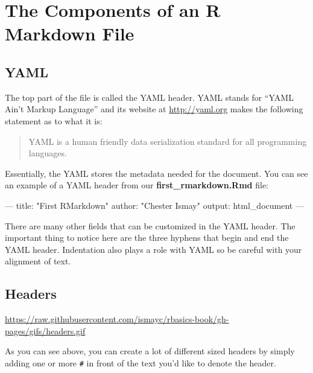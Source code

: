 \documentclass[]{tufte-book}
\newenvironment{Shaded}{\begin{snugshade}}{\end{snugshade}}
\newcommand{\StringTok}[1]{\textcolor[rgb]{0.31,0.60,0.02}{{#1}}}
\newcommand{\OtherTok}[1]{\textcolor[rgb]{0.56,0.35,0.01}{{#1}}}
\newcommand{\FunctionTok}[1]{\textcolor[rgb]{0.00,0.00,0.00}{{#1}}}
\newcommand{\NormalTok}[1]{{#1}}
\theoremstyle{definition}
\theoremstyle{definition}
\theoremstyle{remark}
\begin{document}
\section{The Components of an R Markdown
File}\label{the-components-of-an-r-markdown-file}

\subsection{YAML}\label{yaml}

The top part of the file is called the YAML header. YAML stands for
``YAML Ain't Markup Language'' and its website at \url{http://yaml.org}
makes the following statement as to what it is:

\begin{quote}
YAML is a human friendly data serialization standard for all programming
languages.
\end{quote}

Essentially, the YAML stores the metadata needed for the document. You
can see an example of a YAML header from our
\textbf{first\_rmarkdown.Rmd} file:

\begin{Shaded}
\begin{Highlighting}[]
\OtherTok{---}
\FunctionTok{title:} \StringTok{"First RMarkdown"}
\FunctionTok{author:} \StringTok{"Chester Ismay"}
\FunctionTok{output:} \NormalTok{html_document}
\OtherTok{---}
\end{Highlighting}
\end{Shaded}

There are many other fields that can be customized in the YAML header.
The important thing to notice here are the three hyphens that begin and
end the YAML header. Indentation also plays a role with YAML so be
careful with your alignment of text.

\subsection{Headers}\label{headers}

\vspace{0.1in}

\begin{center}\footnotesize{\url{https://raw.githubusercontent.com/ismayc/rbasics-book/gh-pages/gifs/headers.gif}}\end{center}

\vspace{0.1in}

As you can see above, you can create a lot of different sized headers by
simply adding one or more \texttt{\#} in front of the text you'd like to
denote the header.
\end{document}
